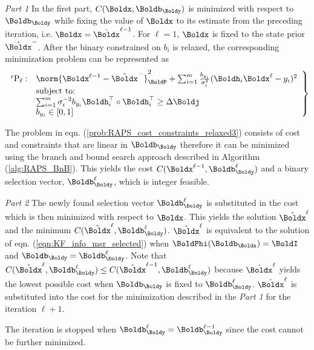 \textit{Part 1}
In the first part, $C(\Boldx,\Boldb_{\Boldy})$ is minimized with respect to $\Boldb_{\Boldy}$ while fixing the value of $\Boldx$ to its estimate from the preceding iteration, i.e. $\Boldx = \hat{\Boldx}^{\ell-1}$. 
For $\ell = 1$, $\Boldx$ is fixed to the state prior $\hat{\Boldx}^-$.
After the binary constrained on $b_i$ is relaxed, the corresponding minimization problem can be represented as
\begin{align} \label{prob:RAPS_cost_constraints_relaxed3}
	\left.
	\begin{array}{rl}
		^\text{r}\text{P}_{\ell}: &
		\norm{ \Boldx^{\ell-1} - \hat{\Boldx}^-}_{\BoldP}^2 
		+   \sum_{i=1}^{m} \frac{b_{y_i}}{\sigma_i^2} (\Boldh_i 
		\Boldx^{\ell} - y_i)^2 \\ 
		& \text{subject to:} \\
		& \sum_{i=1}^m \sigma_i^{-2} b_{y_i} 
		\Boldh_i^\top \circ \Boldh_i^\top \ge \Delta \Boldj \\
		& b_{y_i} \in [0,1]
	\end{array}
	\right\}
\end{align}

The problem in eqn. (\ref{prob:RAPS_cost_constraints_relaxed3}) consists of cost and constraints that are linear in $\Boldb_{\Boldy}$ therefore it can be minimized using the branch and bound search approach described in Algorithm (\ref{alg:RAPS_BnB}). This yields the  cost $C(\Boldx^{\ell-1},\Boldb^{\ell}_{\Boldy})$ and a binary selection vector, $\Boldb^{\ell}_{\Boldy}$, which is integer feasible.

\textit{Part 2}
The newly found selection vector $\Boldb^{\ell}_{\Boldy}$ is substituted in the cost which is then minimized with respect to $\Boldx$. 
This yields the solution $\hat{\Boldx}^{\ell}$ and the minimum $C(\hat{\Boldx}^{\ell},\Boldb^{\ell}_{\Boldy})$. 
$\hat{\Boldx}^{\ell}$ is equivalent to the solution of eqn. (\ref{eqn:KF_info_msr_selected}) when $\BoldPhi(\Boldb_{\Boldx}) = \BoldI$ and $\Boldb_{\Boldy} = \Boldb^{\ell}_{\Boldy}$. 
Note that $C(\hat{\Boldx}^{\ell},\Boldb^{\ell}_{\Boldy}) \le C(\hat{\Boldx}^{\ell-1},\Boldb^{\ell}_{\Boldy})$ because $\hat{\Boldx}^{\ell}$ yields the lowest possible cost when $\Boldb_{\Boldy}$ is fixed to $\Boldb^{\ell}_{\Boldy}$.
$\hat{\Boldx}^{\ell}$ is substituted into the cost for the minimization described in the \textit{Part 1} for the iteration $\ell+1$.

\noindent
The iteration is stopped when $\Boldb^{\ell}_{\Boldy} = \Boldb^{\ell-1}_{\Boldy}$ since the cost cannot be further minimized.

\clearpage


